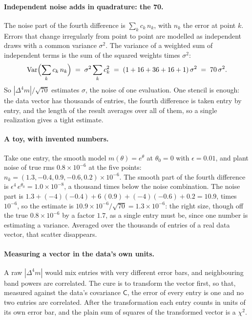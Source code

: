 \documentclass[11pt]{article}
\newcommand{\Cov}{\mathsf{C}}
\begin{document}
\paragraph{Independent noise adds in quadrature: the 70.}
The noise part of the fourth difference is $\sum_k c_k\,n_k$, with
$n_k$ the error at point $k$.  Errors that change irregularly from
point to point are modelled as independent draws with a common
variance $\sigma^2$.  The variance of a weighted sum of independent
terms is the sum of the squared weights times $\sigma^2$:
\begin{equation}
  {\rm Var}\Bigl(\sum_k c_k\,n_k\Bigr)
  \;=\; \sigma^2 \sum_k c_k^2
  \;=\; (1 + 16 + 36 + 16 + 1)\,\sigma^2
  \;=\; 70\,\sigma^2 .
  \label{eq:seventy}
\end{equation}
So $|\Delta^4 m|/\sqrt{70}$ estimates $\sigma$, the noise of one
evaluation.  One stencil is enough: the data vector has thousands of
entries, the fourth difference is taken entry by entry, and the length
of the result averages over all of them, so a single realization gives
a tight estimate.

\paragraph{A toy, with invented numbers.}
Take one entry, the smooth model $m(\theta) = e^{\theta}$ at
$\theta_0 = 0$ with $\epsilon = 0.01$, and plant noise of true rms
$0.8\times10^{-6}$ at the five points:
$n_k = (1.3, -0.4, 0.9, -0.6, 0.2)\times10^{-6}$.  The smooth part of
the fourth difference is $\epsilon^4\,e^{\theta_0} =
1.0\times10^{-8}$, a thousand times below the noise combination.  The
noise part is
$1.3 + (-4)(-0.4) + 6\,(0.9) + (-4)(-0.6) + 0.2 = 10.9$, times
$10^{-6}$, so the estimate is
$10.9\times10^{-6}/\sqrt{70} = 1.3\times10^{-6}$: the right size,
though off the true $0.8\times10^{-6}$ by a factor $1.7$, as a single
entry must be, since one number is estimating a variance.  Averaged
over the thousands of entries of a real data vector, that scatter
disappears.

\paragraph{Measuring a vector in the data's own units.}
A raw $|\Delta^4 m|$ would mix entries with very different error bars,
and neighbouring band powers are correlated.  The cure is to transform
the vector first, so that, measured against the data's covariance
$\Cov$, the error of every entry is one and no two entries are
correlated.  After the transformation each entry counts in units of
its own error bar, and the plain sum of squares of the transformed
vector is a $\chi^2$.
\end{document}
